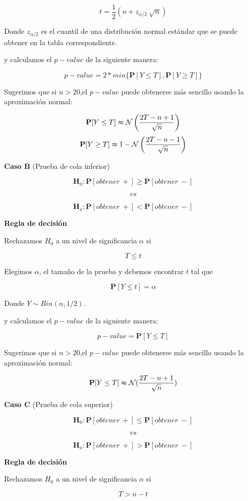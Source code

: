 \documentclass[
  a4paper,
  oneside,
  openany]{book}
\begin{document}
\[t=\frac{1}{2}\left(n+z_{\alpha/2}\ \sqrt{n}\right)\]

Donde \(z_{\alpha/2}\) es el cuantil de una distribución normal estándar que se puede obtener en la tabla correspondiente.

y calculamos el \(p-value\) de la siguiente manera:

\[p-value=2*min\{\mathbf{P}[Y\leq T],\mathbf{P}[Y\geq T]\}\]

Sugerimos que si \(n>20\),el \(p-value\) puede obtenerse más sencillo usando la aproximación normal:

\[\mathbf{P}[Y\leq T] \thickapprox  \mathcal{N} \left(\frac{2T-n+1}{\sqrt{n}}\right)\]
\[\mathbf{P}[Y\geq T] \thickapprox 1- \mathcal{N} \left(\frac{2T-n-1}{\sqrt{n}}\right)\]

\textbf{Caso B} (Prueba de cola inferior)

\[\textbf{H}_0: \mathbf{P}[obtener\ +] \geq \mathbf{P}[obtener\ -]\]

\[vs\]

\[\textbf{H}_a: \mathbf{P}[obtener\ +] < \mathbf{P}[obtener\ -]\]

\textbf{Regla de decisión}

Rechazamos \(H_0\) a un nivel de significancia \(\alpha\) si

\[T \leq t\]

Elegimos \(\alpha\), el tamaño de la prueba y debemos encontrar \(t\) tal que

\[\mathbf{P}[Y \leq t]=\alpha\]

Donde \(Y \sim Bin (n,1/2)\).

y calculamos el \(p-value\) de la siguiente manera:

\[p-value=\mathbf{P}[Y\leq T]\]

Sugerimos que si \(n>20\),el \(p-value\) puede obtenerse más sencillo usando la aproximación normal:

\[\mathbf{P}[Y\leq T] \thickapprox  \mathcal{N} (\frac{2T-n+1}{\sqrt{n}})\]

\textbf{Caso C} (Prueba de cola superior)

\[\textbf{H}_0: \mathbf{P}[obtener\ +] \leq \mathbf{P}[obtener\ -]\]

\[vs\]

\[\textbf{H}_a: \mathbf{P}[obtener\ +] > \mathbf{P}[obtener\ -]\]

\textbf{Regla de decisión}

Rechazamos \(H_0\) a un nivel de significancia \(\alpha\) si

\[T > n-t \]
\end{document}
